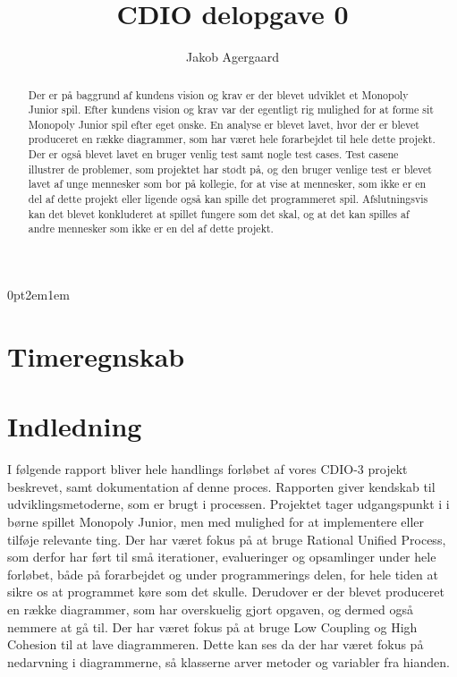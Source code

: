\documentclass{article}
\title{CDIO delopgave 0}
\author{Jakob Agergaard}
\begin{document}
\titlespacing{\section}
    {0pt}{2em}{1em}



\normalsize
\begin{abstract}
Der er på baggrund af kundens vision og krav er der blevet udviklet et Monopoly Junior spil. Efter kundens vision og krav var der egentligt rig mulighed for at forme sit Monopoly Junior spil efter eget ønske. En analyse er blevet lavet, hvor der er blevet produceret en række diagrammer, som har været hele forarbejdet til hele dette projekt. Der er også blevet lavet en bruger venlig test samt nogle test cases. Test casene illustrer de problemer, som projektet har stødt på, og den bruger venlige test er blevet lavet af unge mennesker som bor på kollegie, for at vise at mennesker, som ikke er en del af dette projekt eller ligende også kan spille det programmeret spil. Afslutningsvis kan det blevet konkluderet at spillet fungere som det skal, og at det kan spilles af andre mennesker som ikke er en del af dette projekt.
\end{abstract}
\break 

\tableofcontents
\break 

\section{Timeregnskab}

\section{Indledning}
I følgende rapport bliver hele handlings forløbet af vores CDIO-3 projekt beskrevet, samt dokumentation af denne proces. Rapporten giver kendskab til udviklingsmetoderne, som er brugt i processen. Projektet tager udgangspunkt i i børne spillet Monopoly Junior, men med mulighed for at implementere eller tilføje relevante ting. Der har været fokus på at bruge Rational Unified Process, som derfor har ført til små iterationer, evalueringer og opsamlinger under hele forløbet, både på forarbejdet og under programmerings delen, for hele tiden at sikre os at programmet køre som det skulle. Derudover er der blevet produceret en række diagrammer, som har overskuelig gjort opgaven, og dermed også nemmere at gå til. Der har været fokus på at bruge Low Coupling og High Cohesion til at lave diagrammeren. Dette kan ses da der har været fokus på nedarvning i diagrammerne, så klasserne arver metoder og variabler fra hianden. 
\end{document}
